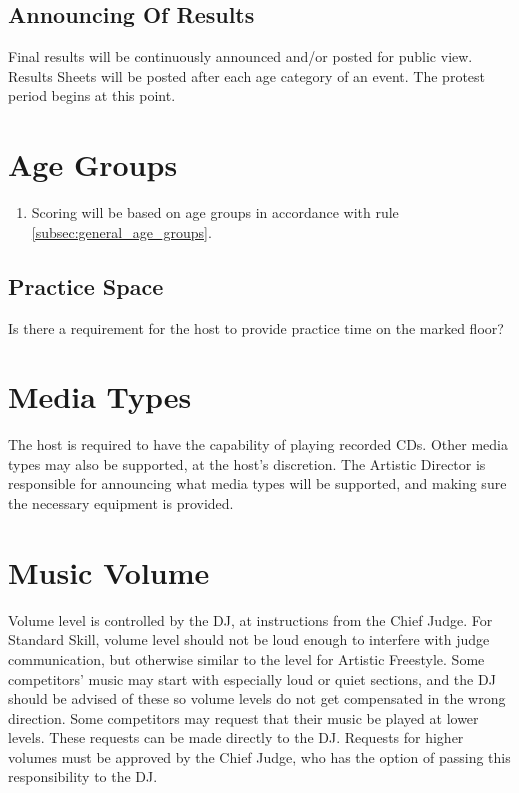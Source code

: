 \subsection{Announcing Of Results}

Final results will be continuously announced and/or posted for public view.
Results Sheets will be posted after each age category of an event.
The protest period begins at this point.

\section{Age Groups}

\begin{enumerate}[leftmargin=1.5em,labelsep=*]
	\item Scoring will be based on age groups in accordance with rule \ref{subsec:general_age_groups}.
\end{enumerate}

\begin{comment2016}
\section{Practice Space}

Is there a requirement for the host to provide practice time on the marked
floor?
\end{comment2016}

\section{Media Types}
The host is required to have the capability of playing recorded CDs.
Other media types may also be supported, at the host's discretion.
The Artistic Director is responsible for announcing what media types will be supported, and making sure the necessary equipment is provided.

\section{Music Volume}
Volume level is controlled by the DJ, at instructions from the Chief Judge.
For Standard Skill, volume level should not be loud enough to interfere with judge communication, but otherwise similar to the level for Artistic Freestyle.
Some competitors' music may start with especially loud or quiet sections, and the DJ should be advised of these so volume levels do not get compensated in the wrong direction.
Some competitors may request that their music be played at lower levels.
These requests can be made directly to the DJ.
Requests for higher volumes must be approved by the Chief Judge, who has the option of passing this responsibility to the DJ.
